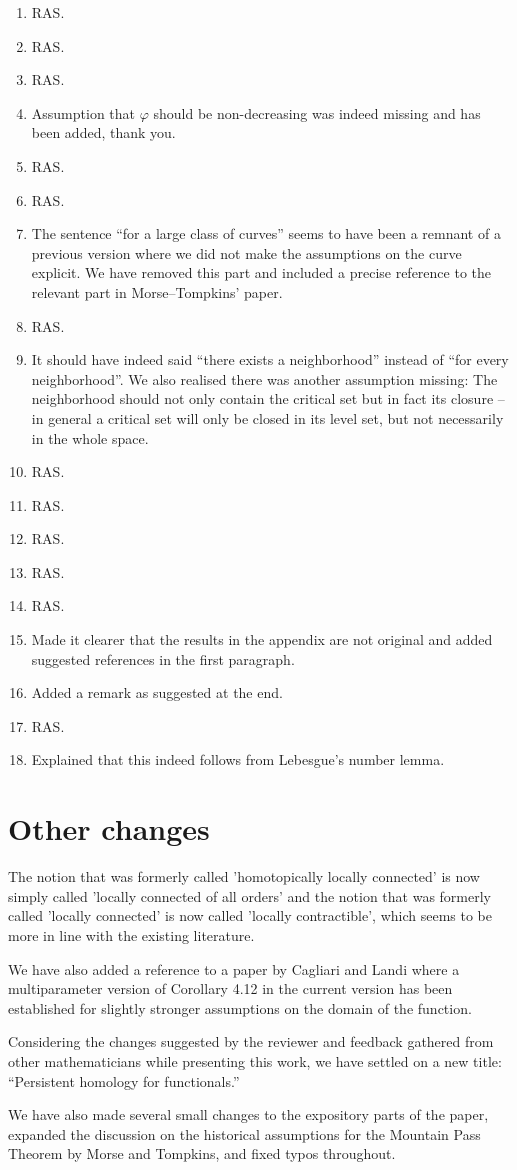 \documentclass{article}
\begin{document}
\begin{enumerate}
		\item RAS.
		\item RAS.
		\item RAS.
		\item Assumption that $\varphi$ should be non-decreasing was indeed missing and has been added, thank you.
		\item RAS.
		\item RAS.
		\item The sentence ``for a large class of curves'' seems to have been a remnant of a previous version where we did not make the assumptions on the curve explicit. We have removed this part and included a precise reference to the relevant part in Morse--Tompkins' paper.
		\item RAS.
		\item It should have indeed said ``there exists a neighborhood'' instead of ``for every neighborhood''. We also realised there was another assumption missing: The neighborhood should not only contain the critical set but in fact its closure -- in general a critical set will only be closed in its level set, but not necessarily in the whole space.
		\item RAS.
		\item RAS.
		\item RAS.
		\item RAS.
		\item RAS.
		\item Made it clearer that the results in the appendix are not original and added suggested references in the first paragraph.
		\item Added a remark as suggested at the end.
		\item RAS.
		\item Explained that this indeed follows from Lebesgue's number lemma.
	\end{enumerate}
	
	\section{Other changes}
	The notion that was formerly called 'homotopically locally connected' is now simply called 'locally connected of all orders' and the notion that was formerly called 'locally connected' is now called 'locally contractible', which seems to be more in line with the existing literature.
	
	We have also added a reference to a paper by Cagliari and Landi where a multiparameter version of Corollary 4.12 in the current version has been established for slightly stronger assumptions on the domain of the function.
	
	Considering the changes suggested by the reviewer and feedback gathered from other mathematicians while presenting this work, we have settled on a new title: ``Persistent homology for functionals.''
	
	We have also made several small changes to the expository parts of the paper, expanded the discussion on the historical assumptions for the Mountain Pass Theorem by Morse and Tompkins, and fixed typos throughout.
\end{document}
